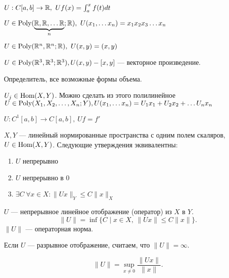 \begin{ex}\label{ex_4_func}
    $ U: C[a, b] \to  \mathbb{R}, ~ Uf(x) = \int_{a}^{x} f(t)dt $
\end{ex}
\begin{ex}\label{ex_5_func}
    $ U \in {\mathop{\text{\rm Poly}}}(\underbrace{\mathbb{R}, \mathbb{R}, \ldots \mathbb{R}}_{n}; \mathbb{R}), ~ U(x_1, \ldots x_{n}) = x_1x_2x_3 \ldots x_{n}$
\end{ex}
\begin{ex}\label{ex_6_func}
    $ U \in {\mathop{\text{\rm Poly}}}(\mathbb{R}^{n}, \mathbb{R}^{n}; \mathbb{R}), ~ U(x, y) = (x, y)$
\end{ex}
\begin{ex}\label{ex_7_func}
    $ U \in {\mathop{\text{\rm Poly}}}(\mathbb{R}^3,\mathbb{R}^3;\mathbb{R}^3), U(x, y) - [x, y] $ --- векторное произведение.
\end{ex}
\begin{ex}\label{ex_8_func}
    Определитель, все возможные формы объема.
\end{ex}
\begin{ex}\label{ex_9_func}
    $ U_j \in {\mathop{\text{\rm Hom}}}(X, Y)$. Можно сделать из этого полилинейное $ U \in {\mathop{\text{\rm Poly}}}(X_1, X_2, \ldots , X_n; Y), U(x_1, \ldots x_{n}) = U_1x_1+ U_2x_2+ \ldots U_nx_{n}$
\end{ex}
\begin{ex}\label{ex_10_func}
    $ U: C^{1}[a, b] \to  C[a,b], ~ Uf = f'$
\end{ex}
\begin{thm}
    $ X, Y$ --- линейный нормированные пространства с одним полем скаляров, $ U \in {\mathop{\text{\rm Hom}}}(X, Y)$.
    Следующие утверждения эквивалентны:
    \begin{enumerate}[noitemsep]
	\item $ U$ непрерывно
	\item $ U$ непрерывно в 0
	\item $ \exists C ~ \forall  x \in X \colon \| Ux \| _Y \le  C \| x \|_X $
    \end{enumerate}
\end{thm}
\begin{defn}
    $ U$ --- непрерывное  линейное отображение (оператор) из $ X$ в $ Y$.
    \[
	\| U \|  = \inf \{C \mid x \in X, ~ \| Ux \| \le C \| x \| \}
    .\]
    $ \| U \|  $ --- {\sf операторная норма}.
\end{defn}
\begin{note}
    Если $ U$ --- разрывное отображение, считаем, что $ \| U \|  = \infty$.
\end{note}
\begin{note}
    \[
	\| U \|  = \sup_{x \ne 0} \frac{\| Ux \|}{\| x \| }
    .\]
\end{note}
